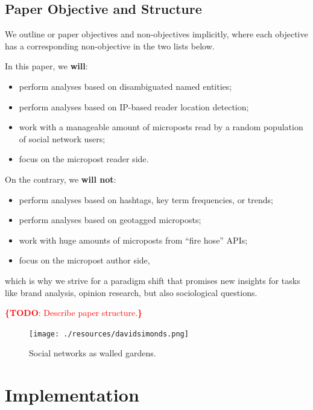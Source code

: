 \documentclass{iosart2c}
\newcommand{\todo}[1]{\noindent\textcolor{red}{{\bf \{TODO}: #1{\bf \}}}}
\begin{document}
\subsection{Paper Objective and Structure}
We outline or paper objectives and non-objectives implicitly, where  each objective has a corresponding non-objective in the two lists below.

\noindent In this paper, we \textbf{will}:
\begin{itemize}%
	\item perform analyses based on disambiguated named entities;
	\item perform analyses based on IP-based reader location detection;
	\item work with a manageable amount of microposts read by a random population of social network users;
	\item focus on the micropost reader side.
\end{itemize}
On the contrary, we \textbf{will not}:
\begin{itemize}%
	\item perform analyses based on hashtags, key term frequencies, or trends;
	\item perform analyses based on geotagged microposts;
	\item work with huge amounts of microposts from ``fire hose'' APIs;
	\item focus on the micropost author side,
\end{itemize}
which is why we strive for a paradigm shift that promises new insights for tasks like brand analysis, opinion research, but also sociological questions.

\todo{Describe paper structure.}

\begin{figure}
\centering
\texttt{[image: ./resources/davidsimonds.png]}
\caption{Social networks as walled gardens.~\cite{DavidSimonds}}
\label{fig:DavidSimonds}
\end{figure}

\section{Implementation} \label{sec:implementation}
\end{document}
